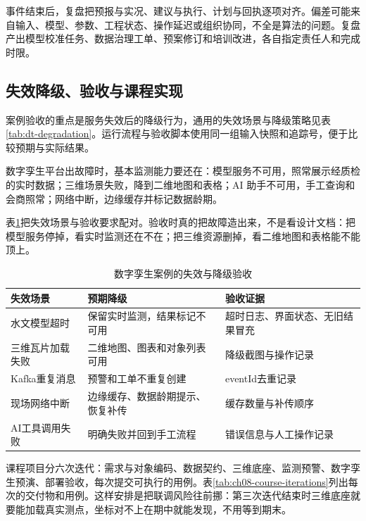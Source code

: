 事件结束后，复盘把预报与实况、建议与执行、计划与回执逐项对齐。偏差可能来自输入、模型、参数、工程状态、操作延迟或组织协同，不全是算法的问题。复盘产出模型校准任务、数据治理工单、预案修订和培训改进，各自指定责任人和完成时限。

\subsection{失效降级、验收与课程实现}\label{sec:ch08-twin-acceptance}

案例验收的重点是服务失效后的降级行为，通用的失效场景与降级策略见表\ref{tab:dt-degradation}。运行流程与验收脚本使用同一组输入快照和追踪号，便于比较预期与实际结果。

数字孪生平台出故障时，基本监测能力要还在：模型服务不可用，照常展示经质检的实时数据；三维场景失败，降到二维地图和表格；AI 助手不可用，手工查询和会商照常；网络中断，边缘缓存并标记数据龄期。

表\ref{tab:twin-failure-acceptance}把失效场景与验收要求配对。验收时真的把故障造出来，不是看设计文档：把模型服务停掉，看实时监测还在不在；把三维资源删掉，看二维地图和表格能不能顶上。

\begin{table}[htbp]
\centering
\caption{数字孪生案例的失效与降级验收}
\label{tab:twin-failure-acceptance}
\begin{tabular}{p{2.7cm}p{4.2cm}p{5.5cm}}
\toprule
失效场景 & 预期降级 & 验收证据 \\
\midrule
水文模型超时 & 保留实时监测，结果标记不可用 & 超时日志、界面状态、无旧结果冒充 \\
三维瓦片加载失败 & 二维地图、图表和对象列表可用 & 降级截图与操作记录 \\
Kafka重复消息 & 预警和工单不重复创建 & eventId去重记录 \\
现场网络中断 & 边缘缓存、数据龄期提示、恢复补传 & 缓存数量与补传顺序 \\
AI工具调用失败 & 明确失败并回到手工流程 & 错误信息与人工操作记录 \\
\bottomrule
\end{tabular}
\end{table}

课程项目分六次迭代：需求与对象编码、数据契约、三维底座、监测预警、数字孪生预演、部署验收，每次提交可执行的用例。表\ref{tab:ch08-course-iterations}列出每次的交付物和用例。这样安排是把联调风险往前挪：第三次迭代结束时三维底座就要能加载真实测点，坐标对不上在期中就能发现，不用等到期末。

